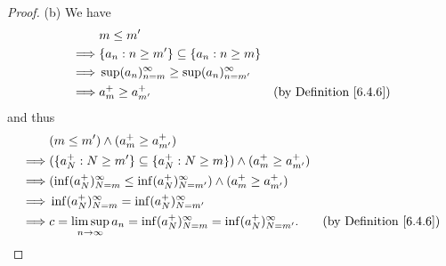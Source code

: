 \begin{proof}{(b)}
    We have
    \begin{align*}
                 & m \leq m'                                                                                    \\
        \implies & \{a_n : n \geq m'\} \subseteq \{a_n : n \geq m\}                                             \\
        \implies & \sup(a_n)_{n = m}^\infty \geq \sup(a_n)_{n = m'}^\infty                                      \\
        \implies & a_m^+ \geq a_{m'}^+                                     & \text{(by Definition \ref{6.4.6})}
    \end{align*}
    and thus
    \begin{align*}
                 & (m \leq m') \land (a_m^+ \geq a_{m'}^+)                                                                                         \\
        \implies & (\{a_N^+ : N \geq m'\} \subseteq \{a_N^+ : N \geq m\}) \land (a_m^+ \geq a_{m'}^+)                                              \\
        \implies & (\inf(a_N^+)_{N = m}^\infty \leq \inf(a_N^+)_{N = m'}^\infty) \land (a_m^+ \geq a_{m'}^+)                                       \\
        \implies & \inf(a_N^+)_{N = m}^\infty = \inf(a_N^+)_{N = m'}^\infty                                                                        \\
        \implies & c = \limsup_{n \to \infty} a_n = \inf(a_N^+)_{N = m}^\infty = \inf(a_N^+)_{N = m'}^\infty. & \text{(by Definition \ref{6.4.6})}
    \end{align*}
\end{proof}

